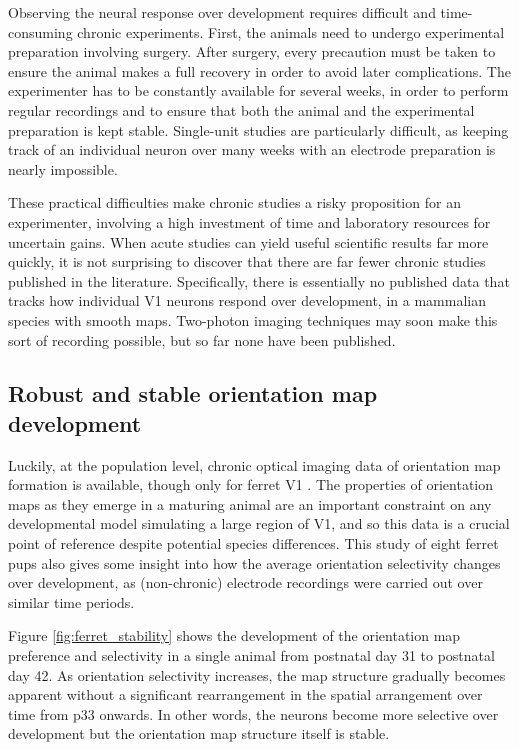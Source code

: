 \documentclass[phd,ianc,twoside]{infthesis}
\begin{document}
Observing the neural response over development requires difficult and
time-con\-suming chronic experiments. First, the animals need to undergo
experimental preparation involving surgery. After surgery, every
precaution must be taken to ensure the animal makes a full recovery in
order to avoid later complications. The experimenter has to be
constantly available for several weeks, in order to perform regular
recordings and to ensure that both the animal and the experimental
preparation is kept stable. Single-unit studies are particularly
difficult, as keeping track of an individual neuron over many weeks
with an electrode preparation is nearly impossible.

These practical difficulties make chronic studies a risky proposition
for an experimenter, involving a high investment of time and laboratory
resources for uncertain gains. When acute studies can yield useful
scientific results far more quickly, it is not surprising to discover
that there are far fewer chronic studies published in the literature.
Specifically, there is essentially no published data that tracks how
individual V1 neurons respond over development, in a mammalian species
with smooth maps.  Two-photon imaging techniques may soon make this
sort of recording possible, but so far none have been published.

\subsection{Robust and stable orientation map development}
\label{section:ferret_map_stability}

Luckily, at the population level, chronic optical imaging data of
orientation map formation is available, though only for ferret V1
\citep{chapman_jn96}.  The properties of orientation maps as they
emerge in a maturing animal are an important constraint on any
developmental model simulating a large region of V1, and so this data
is a crucial point of reference despite potential species differences.
This study of eight ferret pups also gives some insight into how the
average orientation selectivity changes over development, as
(non-chronic) electrode recordings were carried out over similar time
periods.

Figure \ref{fig:ferret_stability} shows the development of the
orientation map preference and selectivity in a single animal from
postnatal day 31 to postnatal day 42. As orientation selectivity
increases, the map structure gradually becomes apparent without a
significant rearrangement in the spatial arrangement over time from p33
onwards. In other words, the neurons become more selective over
development but the orientation map structure itself is stable.
\end{document}
